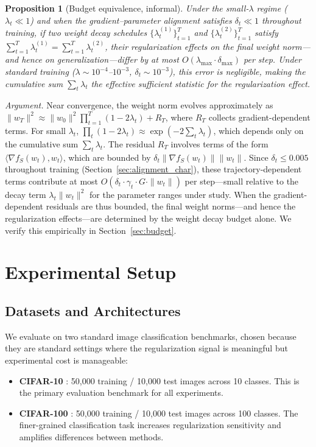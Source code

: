 \documentclass{article}
\newtheorem{proposition}{Proposition}
\begin{document}
\begin{proposition}[Budget equivalence, informal]
  \label{prop:budget}
  Under the small-$\lambda$ regime ($\lambda_t \ll 1$) and when the
  gradient--parameter alignment satisfies $\delta_t \ll 1$ throughout training,
  if two weight decay schedules $\{\lambda_t^{(1)}\}_{t=1}^T$ and
  $\{\lambda_t^{(2)}\}_{t=1}^T$ satisfy
  $\sum_{t=1}^T \lambda_t^{(1)} = \sum_{t=1}^T \lambda_t^{(2)}$,
  their regularization effects on the final weight norm---and hence on
  generalization---differ by at most $O(\lambda_{\max} \cdot \delta_{\max})$ per step.
  Under standard training ($\lambda \sim 10^{-4}$--$10^{-3}$,
  $\delta_t \sim 10^{-3}$), this error is negligible,
  making the cumulative sum $\sum_t \lambda_t$ the effective sufficient statistic
  for the regularization effect.
\end{proposition}

\emph{Argument.}
Near convergence, the weight norm evolves approximately as
$\|w_T\|^2 \approx \|w_0\|^2 \prod_{t=1}^T (1 - 2\lambda_t) + R_T$, where $R_T$
collects gradient-dependent terms.
For small $\lambda_t$,
$\prod_t (1 - 2\lambda_t) \approx \exp(-2\sum_t \lambda_t)$,
which depends only on the cumulative sum $\sum_t \lambda_t$.
The residual $R_T$ involves terms of the form $\langle \nabla f_S(w_t), w_t \rangle$,
which are bounded by $\delta_t \|\nabla f_S(w_t)\| \|w_t\|$.
Since $\delta_t \leq 0.005$ throughout training
(Section~\ref{sec:alignment_char}), these trajectory-dependent terms contribute at
most $O(\delta_t \cdot \gamma_t \cdot G \cdot \|w_t\|)$ per step---small relative
to the decay term $\lambda_t \|w_t\|^2$ for the parameter ranges under study.
When the gradient-dependent residuals are thus bounded, the final weight norms---and
hence the regularization effects---are determined by the weight decay budget alone.
We verify this empirically in Section~\ref{sec:budget}.

\section{Experimental Setup}
\label{sec:experiments}

\subsection{Datasets and Architectures}

We evaluate on two standard image classification benchmarks, chosen because they are
standard settings where the regularization signal is meaningful but experimental cost
is manageable:
\begin{itemize}
  \item \textbf{CIFAR-10} \citep{krizhevsky2009learning}: 50,000 training / 10,000
        test images across 10 classes.
        This is the primary evaluation benchmark for all experiments.
  \item \textbf{CIFAR-100} \citep{krizhevsky2009learning}: 50,000 training / 10,000
        test images across 100 classes.
        The finer-grained classification task increases regularization sensitivity
        and amplifies differences between methods.
\end{itemize}
\end{document}
